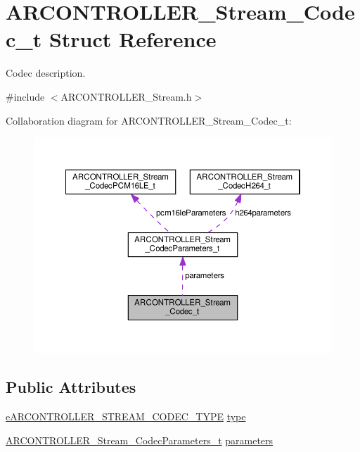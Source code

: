 \hypertarget{struct_a_r_c_o_n_t_r_o_l_l_e_r___stream___codec__t}{}\section{A\+R\+C\+O\+N\+T\+R\+O\+L\+L\+E\+R\+\_\+\+Stream\+\_\+\+Codec\+\_\+t Struct Reference}
\label{struct_a_r_c_o_n_t_r_o_l_l_e_r___stream___codec__t}


Codec description.  




{\ttfamily \#include $<$A\+R\+C\+O\+N\+T\+R\+O\+L\+L\+E\+R\+\_\+\+Stream.\+h$>$}



Collaboration diagram for A\+R\+C\+O\+N\+T\+R\+O\+L\+L\+E\+R\+\_\+\+Stream\+\_\+\+Codec\+\_\+t\+:
\nopagebreak
\begin{figure}[H]
\begin{center}
\leavevmode
\includegraphics[width=350pt]{struct_a_r_c_o_n_t_r_o_l_l_e_r___stream___codec__t__coll__graph}
\end{center}
\end{figure}
\subsection*{Public Attributes}
\begin{DoxyCompactItemize}
\item 
\hyperlink{_a_r_c_o_n_t_r_o_l_l_e_r___stream_8h_a605466999d93d86d6e03b54598edd777}{e\+A\+R\+C\+O\+N\+T\+R\+O\+L\+L\+E\+R\+\_\+\+S\+T\+R\+E\+A\+M\+\_\+\+C\+O\+D\+E\+C\+\_\+\+T\+Y\+PE} \hyperlink{struct_a_r_c_o_n_t_r_o_l_l_e_r___stream___codec__t_a8b02e9ac73436d5e63abb5676a65b851}{type}
\item 
\hyperlink{union_a_r_c_o_n_t_r_o_l_l_e_r___stream___codec_parameters__t}{A\+R\+C\+O\+N\+T\+R\+O\+L\+L\+E\+R\+\_\+\+Stream\+\_\+\+Codec\+Parameters\+\_\+t} \hyperlink{struct_a_r_c_o_n_t_r_o_l_l_e_r___stream___codec__t_a3924ba1598ea2421fcaf0ee3e193481f}{parameters}
\end{DoxyCompactItemize}



